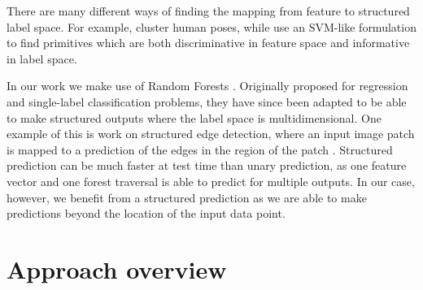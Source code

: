 \documentclass[10pt,twocolumn,letterpaper]{article}
\begin{document}
There are many different ways of finding the mapping from feature to structured label space.
For example, \cite{bourdev-iccv-2009} cluster human poses, while \cite{fouhey-iccv-2013} use an SVM-like formulation to find primitives which are both discriminative in feature space and informative in label space.

In our work we make use of Random Forests \cite{breiman-ml-2001}.
Originally proposed for regression and single-label classification problems, they have since been adapted to be able to make structured outputs where the label space is multidimensional.
One example of this is work on structured edge detection, where an input image patch is mapped to a prediction of the edges in the region of the patch \cite{dollar-iccv-2013}.
Structured prediction can be much faster at test time than unary prediction, as one feature vector and one forest traversal is able to predict for multiple outputs.
In our case, however, we benefit from a structured prediction as we are able to make predictions beyond the location of the input data point.




\section{Approach overview}
\end{document}
